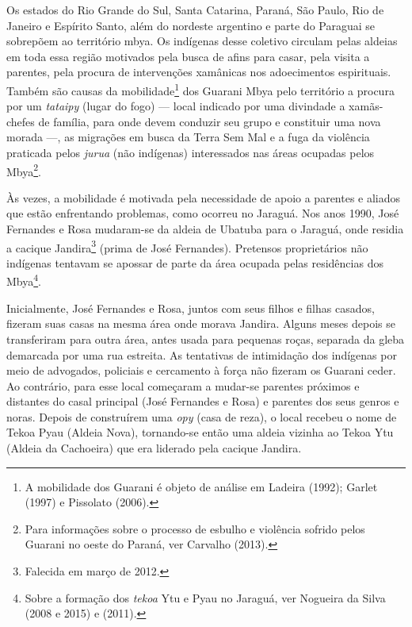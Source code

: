 Os estados do Rio Grande do Sul, Santa Catarina, Paraná, São Paulo, Rio
de Janeiro e Espírito Santo, além do nordeste argentino e parte do
Paraguai se sobrepõem ao território mbya. Os indígenas desse coletivo
circulam pelas aldeias em toda essa região motivados pela busca de
afins para casar, pela visita a parentes, pela procura de intervenções
xamânicas nos adoecimentos espirituais. Também são causas da
mobilidade\footnote{A mobilidade dos Guarani é objeto de análise em
Ladeira (1992); Garlet (1997) e Pissolato (2006).} dos Guarani Mbya
pelo território a procura por um \emph{tataipy} (lugar do fogo) --- local
indicado por uma divindade a xamãs-chefes de família, para onde devem
conduzir seu grupo e constituir uma nova morada ---, as migrações em
busca da Terra Sem Mal e a fuga da violência praticada pelos \emph{jurua}
(não indígenas) interessados nas áreas ocupadas pelos Mbya\footnote{Para
informações sobre o processo de esbulho e violência sofrido pelos
Guarani no oeste do Paraná, ver Carvalho (2013).}.

Às vezes, a mobilidade é motivada pela necessidade de apoio a parentes e
aliados que estão enfrentando problemas, como ocorreu no Jaraguá. Nos
anos 1990, José Fernandes e Rosa mudaram-se da aldeia de Ubatuba para o
Jaraguá, onde residia a cacique Jandira\footnote{Falecida em março de
2012.} (prima de José Fernandes). Pretensos proprietários não indígenas
tentavam se apossar de parte da área ocupada pelas residências dos
Mbya\footnote{Sobre a formação dos \emph{tekoa} Ytu e Pyau no Jaraguá, ver
Nogueira da Silva (2008 e 2015) e  (2011).}. 

Inicialmente, José Fernandes e Rosa, juntos com seus filhos e filhas
casados, fizeram suas casas na mesma área onde morava Jandira. Alguns
meses depois se transferiram para outra área, antes usada para pequenas
roças, separada da gleba demarcada por uma rua estreita. As tentativas
de intimidação dos indígenas por meio de advogados, policiais e
cercamento à força não fizeram os Guarani ceder. Ao contrário, para
esse local começaram a mudar-se parentes próximos e distantes do casal
principal (José Fernandes e Rosa) e parentes dos seus genros e noras.
Depois de construírem uma \emph{opy} (casa de reza), o local recebeu o nome de
Tekoa Pyau (Aldeia Nova), tornando-se então uma aldeia vizinha ao Tekoa
Ytu (Aldeia da Cachoeira) que era liderado pela cacique Jandira.

